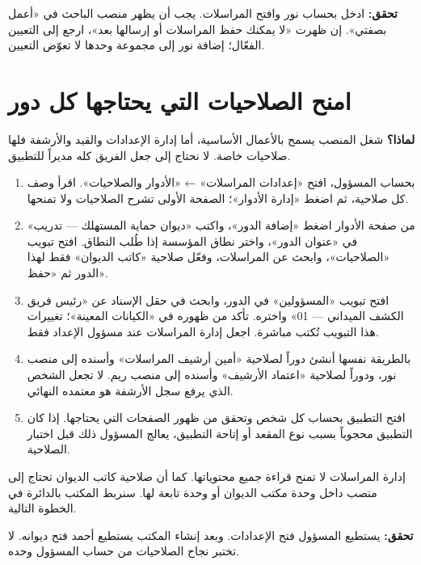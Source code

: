 \textbf{تحقق:} ادخل بحساب نور وافتح المراسلات. يجب أن يظهر منصب الباحث في «أعمل بصفتي». إن ظهرت «لا يمكنك حفظ المراسلات أو إرسالها بعد»، ارجع إلى التعيين الفعّال؛ إضافة نور إلى مجموعة وحدها لا تعوّض التعيين.

\section{امنح الصلاحيات التي يحتاجها كل دور}
\label{sec:permissions}
\textbf{لماذا؟} شغل المنصب يسمح بالأعمال الأساسية، أما إدارة الإعدادات والقيد والأرشفة فلها صلاحيات خاصة. لا نحتاج إلى جعل الفريق كله مديراً للتطبيق.
\begin{enumerate}
\item بحساب المسؤول، افتح «إعدادات المراسلات» ← «الأدوار والصلاحيات». اقرأ وصف كل صلاحية، ثم اضغط «إدارة الأدوار»؛ الصفحة الأولى تشرح الصلاحيات ولا تمنحها.
\item من صفحة الأدوار اضغط «إضافة الدور»، واكتب «ديوان حماية المستهلك — تدريب» في «عنوان الدور»، واختر نطاق المؤسسة إذا طُلب النطاق. افتح تبويب «الصلاحيات»، وابحث عن المراسلات، وفعّل صلاحية «كاتب الديوان» فقط لهذا الدور ثم «حفظ».
\item افتح تبويب «المسؤولين» في الدور، وابحث في حقل الإسناد عن «رئيس فريق الكشف الميداني — 01» واختره. تأكد من ظهوره في «الكيانات المعينة»؛ تغييرات هذا التبويب تُكتب مباشرة. اجعل إدارة المراسلات عند مسؤول الإعداد فقط.
\item بالطريقة نفسها أنشئ دوراً لصلاحية «أمين أرشيف المراسلات» وأسنده إلى منصب نور، ودوراً لصلاحية «اعتماد الأرشيف» وأسنده إلى منصب ريم. لا تجعل الشخص الذي يرفع سجل الأرشفة هو معتمده النهائي.
\item افتح التطبيق بحساب كل شخص وتحقق من ظهور الصفحات التي يحتاجها. إذا كان التطبيق محجوباً بسبب نوع المقعد أو إتاحة التطبيق، يعالج المسؤول ذلك قبل اختبار الصلاحية.
\end{enumerate}
\begin{rcnote}
إدارة المراسلات لا تمنح قراءة جميع محتوياتها. كما أن صلاحية كاتب الديوان تحتاج إلى منصب داخل وحدة مكتب الديوان أو وحدة تابعة لها. سنربط المكتب بالدائرة في الخطوة التالية.
\end{rcnote}
\textbf{تحقق:} يستطيع المسؤول فتح الإعدادات. وبعد إنشاء المكتب يستطيع أحمد فتح ديوانه. لا تختبر نجاح الصلاحيات من حساب المسؤول وحده.


